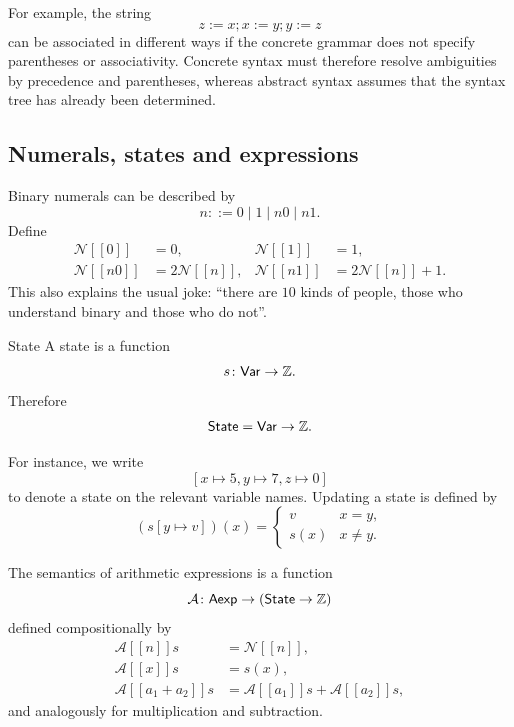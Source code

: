 \documentclass[a4paper]{article}
\newcommand{\State}{\mathsf{State}}
\newcommand{\Aexp}{\mathsf{Aexp}}
\newcommand{\Var}{\mathsf{Var}}
\newcommand{\sem}[1]{[\![#1]\!]}
\begin{document}
For example, the string
\[
    z:=x;x:=y;y:=z
\]
can be associated in different ways if the concrete grammar does not specify parentheses or associativity.
Concrete syntax must therefore resolve ambiguities by precedence and parentheses, whereas abstract syntax assumes that the syntax tree has already been determined.

\subsection{Numerals, states and expressions}

Binary numerals can be described by
\[
    n ::= 0\mid1\mid n0\mid n1.
\]
Define
\begin{align*}
    \mathcal N\sem{0}&=0,
    &\mathcal N\sem{1}&=1,\\
    \mathcal N\sem{n0}&=2\mathcal N\sem{n},
    &\mathcal N\sem{n1}&=2\mathcal N\sem{n}+1.
\end{align*}
This also explains the usual joke: ``there are \(10\) kinds of people, those who understand binary and those who do not''.

\begin{snippetdefinition}{State}
    A state is a function
    \[
        s\colon\Var\fromto\integernumbers.
    \]
    Therefore
    \[
        \State = \Var\fromto\integernumbers.
    \]
\end{snippetdefinition}

For instance, we write
\[
    [x\mapsto5,y\mapsto7,z\mapsto0]
\]
to denote a state on the relevant variable names.
Updating a state is defined by
\[
    (s[y\mapsto v])(x)
    =
    \begin{cases}
        v & x=y,\\
        s(x) & x\neq y.
    \end{cases}
\]

The semantics of arithmetic expressions is a function
\[
    \mathcal A\colon\Aexp\fromto(\State\fromto\integernumbers)
\]
defined compositionally by
\begin{align*}
    \mathcal A\sem{n}s &= \mathcal N\sem{n},\\
    \mathcal A\sem{x}s &= s(x),\\
    \mathcal A\sem{a_1+a_2}s &= \mathcal A\sem{a_1}s+\mathcal A\sem{a_2}s,
\end{align*}
and analogously for multiplication and subtraction.
\end{document}

